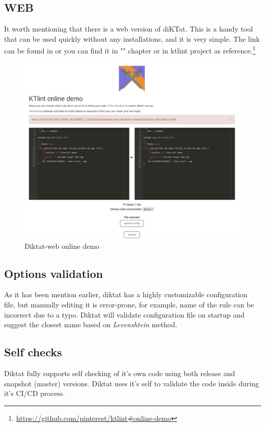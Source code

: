 \subsection{WEB}
It worth mentioning that there is a web version of diKTat. This is a handy tool that can be used quickly without any installations, and it is very simple. The link can be found in or you can find it in "" chapter or in ktlint project as reference.\footnote{\url{https://github.com/pinterest/ktlint\#online-demo}}
\begin{figure}[H]
  \centering
  \includegraphics[scale=0.3]{pictures/web-example.png}
  \caption{Diktat-web online demo}
\end{figure}

\subsection{Options validation}
As it has been mention earlier, diktat has a highly customizable configuration file, but manually editing it is error-prone, for example, name of the rule can be incorrect due to a typo. Diktat will validate configuration file on startup and suggest the closest name based on \textsl{Levenshtein} method.

\subsection{Self checks}
Diktat fully supports self checking of it's own code using both release and snapshot (master) versions. Diktat uses it's self to validate the code inside during it's CI/CD process.
